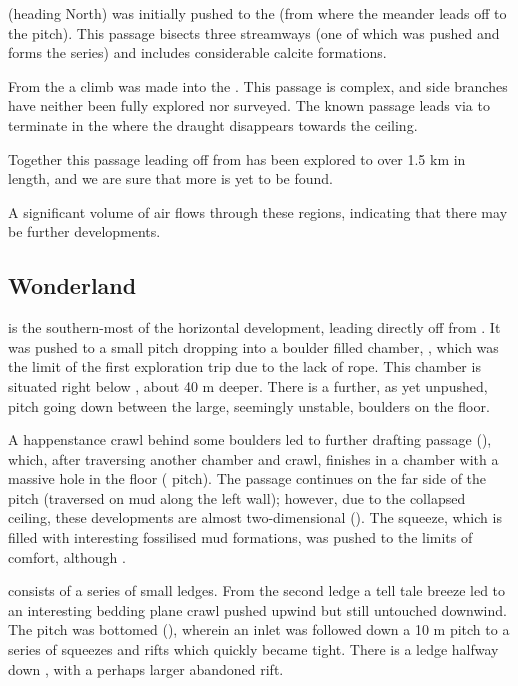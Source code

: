 \textbf{} (heading North) was initially pushed to the  (from where the  meander leads off to the  pitch). This passage bisects three streamways (one of which was pushed and forms the  series) and includes considerable calcite formations.

From the  a climb was made into the \textbf{}. This passage is complex, and side branches have neither
been fully explored nor surveyed. The known passage leads via  to terminate in the  where the draught disappears towards the ceiling.

Together this passage leading off from  has been explored to over 1.5 km in length, and we are sure that more is yet to be found.

A significant volume of air flows through these regions, indicating that there may be further developments.


\subsection{Wonderland}

 is the southern-most of the horizontal development,
leading directly off from . It was pushed to a small pitch
dropping into a boulder filled chamber, , which was
the limit of the first exploration trip due to the lack of rope. This
chamber is situated right below , about 40 m deeper. There is a
further, as yet unpushed, pitch going down between the large, seemingly unstable, boulders on the floor.

A happenstance crawl behind some boulders led to further drafting
passage (), which, after traversing another
chamber and crawl, finishes in a chamber with a massive hole in the
floor ( pitch). The passage continues on the far side of
the pitch (traversed on mud along the left wall); however, due to the
collapsed ceiling, these developments are almost two-dimensional
(). The squeeze, which is filled with interesting
fossilised mud formations, was pushed to the limits of comfort, although
.

 consists of a series of small ledges. From the second
ledge a tell tale breeze led to an interesting bedding plane crawl
pushed upwind but still untouched downwind. The pitch was bottomed (), wherein an inlet was followed down a 10 m pitch to a series of
squeezes and rifts which quickly became tight. There is a ledge halfway
down , with a perhaps larger abandoned rift.

